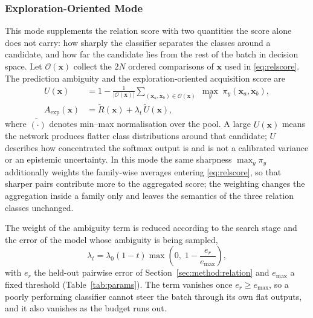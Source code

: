 \documentclass[final,5p,times,twocolumn]{elsarticle}
\newcommand{\vx}{\mathbf{x}}
\begin{document}
\subsubsection{Exploration-Oriented Mode}
\label{sec:method:candidate:exp}

This mode supplements the relation score with two quantities the score alone
does not carry: how sharply the classifier separates the classes around a
candidate, and how far the candidate lies from the rest of the batch in
decision space. Let $\mathcal{O}(\vx)$ collect the $2N$ ordered comparisons of
$\vx$ used in \eqref{eq:relscore}. The prediction ambiguity and the
exploration-oriented acquisition score are
\begin{equation}
\begin{aligned}
U(\vx)&=1-\frac{1}{|\mathcal{O}(\vx)|}
\sum_{(\vx_a,\vx_b)\in\mathcal{O}(\vx)}\;
\max_{y}\;\pi_y(\vx_a,\vx_b),\\
A_{\mathrm{exp}}(\vx)&=\widetilde R(\vx)+\lambda_t\,\widetilde U(\vx),
\end{aligned}
\label{eq:expscore}
\end{equation}
where $\widetilde{(\cdot)}$ denotes min--max normalisation over the pool. A
large $U(\vx)$ means the network produces flatter class distributions around
that candidate; $U$ describes how concentrated the softmax output is and is not
a calibrated variance or an epistemic uncertainty. In this mode the same
sharpness $\max_y\pi_y$ additionally weights the family-wise averages entering
\eqref{eq:relscore}, so that sharper pairs contribute more to the aggregated
score; the weighting changes the aggregation inside a family only and leaves the
semantics of the three relation classes unchanged.

The weight of the ambiguity term is reduced according to the search stage and
the error of the model whose ambiguity is being sampled,
\begin{equation}
\lambda_t=\lambda_0(1-t)\max\!\left(0,\;1-\frac{e_r}{e_{\max}}\right),
\label{eq:lambda}
\end{equation}
with $e_r$ the held-out pairwise error of
Section~\ref{sec:method:relation} and $e_{\max}$ a fixed threshold
(Table~\ref{tab:params}). The term vanishes once $e_r\geq e_{\max}$, so a
poorly performing classifier cannot steer the batch through its own flat
outputs, and it also vanishes as the budget runs out.
\end{document}
